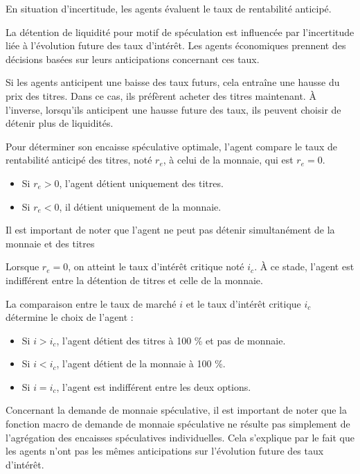 \documentclass[a4paper, 12pt]{report}
\begin{document}
En situation d'incertitude, les agents évaluent le taux de rentabilité anticipé.

La détention de liquidité pour motif de spéculation est influencée par l'incertitude liée à l'évolution future des taux d'intérêt. Les agents économiques prennent des décisions basées sur leurs anticipations concernant ces taux.

Si les agents anticipent une baisse des taux futurs, cela entraîne une hausse du prix des titres. Dans ce cas, ils préfèrent acheter des titres maintenant. À l'inverse, lorsqu'ils anticipent une hausse future des taux, ils peuvent choisir de détenir plus de liquidités.

Pour déterminer son encaisse spéculative optimale, l'agent compare le taux de rentabilité anticipé des titres, noté \( r_e \), à celui de la monnaie, qui est \( r_e = 0 \). 

\begin{itemize}
	\item Si \( r_e > 0 \), l'agent détient uniquement des titres.
	\item Si \( r_e < 0 \), il détient uniquement de la monnaie.
\end{itemize}

Il est important de noter que l'agent ne peut pas détenir simultanément de la monnaie et des titres

Lorsque \( r_e = 0 \), on atteint le taux d'intérêt critique noté \( i_c \). À ce stade, l'agent est indifférent entre la détention de titres et celle de la monnaie. 

La comparaison entre le taux de marché \( i \) et le taux d'intérêt critique \( i_c \) détermine le choix de l'agent :
\begin{itemize}
	\item Si \( i > i_c \), l'agent détient des titres à 100 \% et pas de monnaie.
	\item Si \( i < i_c \), l'agent détient de la monnaie à 100 \%.
	\item Si \( i = i_c \), l'agent est indifférent entre les deux options.
\end{itemize}

Concernant la demande de monnaie spéculative, il est important de noter que la fonction macro de demande de monnaie spéculative ne résulte pas simplement de l'agrégation des encaisses spéculatives individuelles. Cela s'explique par le fait que les agents n'ont pas les mêmes anticipations sur l'évolution future des taux d'intérêt. 
\end{document}
